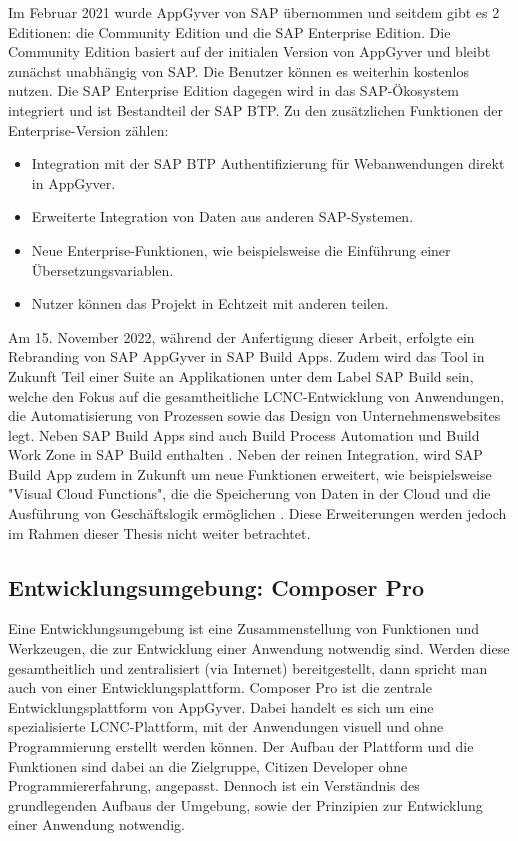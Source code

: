 Im Februar 2021 wurde AppGyver von SAP übernommen und seitdem gibt es 2 Editionen: die Community Edition und die SAP Enterprise Edition. Die Community Edition basiert auf der initialen Version von AppGyver und bleibt zunächst unabhängig von SAP. Die Benutzer können es weiterhin kostenlos nutzen. Die SAP Enterprise Edition dagegen wird in das SAP-Ökosystem integriert und ist Bestandteil der SAP BTP. Zu den zusätzlichen Funktionen der Enterprise-Version zählen: 
 
\begin{itemize}[noitemsep]
\item Integration mit der SAP BTP Authentifizierung für Webanwendungen direkt in AppGyver.
\item Erweiterte Integration von Daten aus anderen SAP-Systemen.
\item Neue Enterprise-Funktionen, wie beispielsweise die Einführung einer Übersetzungsvariablen.
\item Nutzer können das Projekt in Echtzeit mit anderen teilen.
\end{itemize}

Am 15. November 2022, während der Anfertigung dieser Arbeit, erfolgte ein Rebranding von SAP AppGyver in SAP Build Apps. Zudem wird das Tool in Zukunft Teil einer Suite an Applikationen unter dem Label SAP Build sein, welche den Fokus auf die gesamtheitliche LCNC-Entwicklung von Anwendungen, die Automatisierung von Prozessen sowie das Design von Unternehmenswebsites legt. Neben SAP Build Apps sind auch Build Process Automation und Build Work Zone in SAP Build enthalten \cite{sap:lcnc}. Neben der reinen Integration, wird SAP Build App zudem in Zukunft um neue Funktionen erweitert, wie beispielsweise "Visual Cloud Functions", die die Speicherung von Daten in der Cloud und die Ausführung von Geschäftslogik ermöglichen \cite{appgyver:coman}. Diese Erweiterungen werden jedoch im Rahmen dieser Thesis nicht weiter betrachtet.

\subsection{Entwicklungsumgebung: Composer Pro}
Eine Entwicklungsumgebung ist eine Zusammenstellung von Funktionen und Werkzeugen, die zur Entwicklung einer Anwendung notwendig sind. Werden diese gesamtheitlich und zentralisiert (via Internet) bereitgestellt, dann spricht man auch von einer Entwicklungsplattform. Composer Pro ist die zentrale Entwicklungsplattform von AppGyver. Dabei handelt es sich um eine spezialisierte LCNC-Plattform, mit der Anwendungen visuell und ohne Programmierung erstellt werden können. Der Aufbau der Plattform und die Funktionen sind dabei an die Zielgruppe, Citizen Developer ohne Programmiererfahrung, angepasst. Dennoch ist ein Verständnis des grundlegenden Aufbaus der Umgebung, sowie der Prinzipien zur Entwicklung einer Anwendung notwendig.

